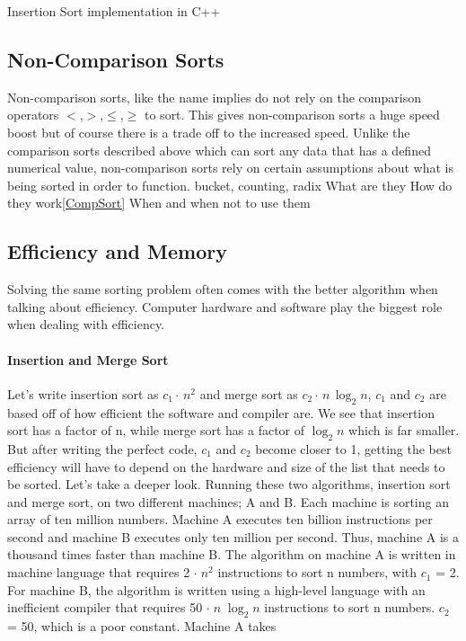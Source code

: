 \documentclass[12pt]{article}
\begin{document}
	
	\begin{Snippet}[h]
		\caption[Insertion Sort]{Insertion Sort implementation in C++}	
		
		\label{snip:ins}
	\end{Snippet}
	
	
	
	\subsection{Non-Comparison Sorts}
	
	Non-comparison sorts, like the name implies do not rely on the comparison operators $<$,$>$,$\le$,$\ge$ to sort.
	This gives non-comparison sorts a huge speed boost but of course there is a trade off to the increased speed. 
	Unlike the comparison sorts described above which can sort any data that has a defined numerical value, non-comparison sorts rely on certain assumptions about what is being sorted in order to function.
	bucket, counting, radix
	What are they
	How do they work\ref{CompSort}
	When and when not to use them
	
	
	\subsection{Efficiency and Memory}
	
	Solving the same sorting problem often comes with the better algorithm when talking about efficiency.
	Computer hardware and software play the biggest role when dealing with efficiency.
	
	\paragraph{Insertion and Merge Sort}
	
	Let’s write insertion sort as $c_1 \cdot\,n^2$ and merge sort as $c_2 \cdot\,n\,\log_2{n}$, $c_1$ and $c_2$ are based off of how efficient the software and compiler are.
	We see that insertion sort has a factor of n, while merge sort has a factor of $\log_2{n}$ which is far smaller.
	But after writing the perfect code, $c_1$ and $c_2$ become closer to 1, getting the best efficiency will have to depend on the hardware and size of the list that needs to be sorted.
	Let’s take a deeper look. Running these two algorithms, insertion sort and merge sort, on two different machines; A and B. Each machine is sorting an array of ten million numbers.
	Machine A executes ten billion instructions per second and machine B executes only ten million per second.
	Thus, machine A is a thousand times faster than machine B.
	The algorithm on machine A is written in machine language that requires 2 $\cdot\;n^2$ instructions to sort n numbers, with $c_1$ = 2.
	For machine B, the algorithm is written using a high-level language with an inefficient compiler that requires 50 $\cdot\;n\;\log_2{n}$ instructions to sort n numbers. $c_2$ = 50, which is a poor constant.
	Machine A takes
	
\end{document}
